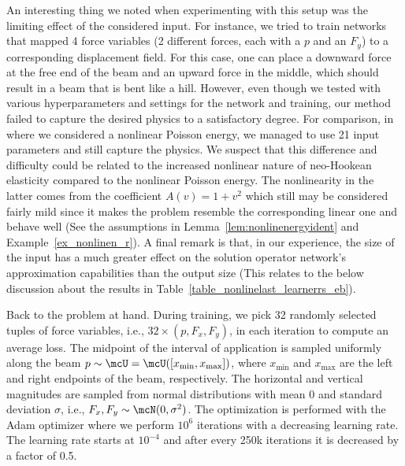 \documentclass[12pt]{article}
\begin{document}
\begin{rem}
An interesting thing we noted when experimenting with this setup was the limiting effect of the considered input. For instance, we tried to train networks that mapped 4 force variables (2 different forces, each with a $p$ and an $F_y$) to a corresponding displacement field. For this case, one can place a downward force at the free end of the beam and an upward force in the middle, which should result in a beam that is bent like a hill. However, even though we tested with various hyperparameters and settings for the network and training, our method failed to capture the desired physics to a satisfactory degree. For comparison, in \cite{BURMAN2025118111} where we considered a nonlinear Poisson energy, we managed to use 21 input parameters and still capture the physics. We suspect that this difference and difficulty could be related to the increased nonlinear nature of neo-Hookean elasticity compared to the nonlinear Poisson energy. The nonlinearity in the latter comes from the coefficient $A(v) = 1 + v^2$ which still may be considered fairly mild since it makes the problem resemble the corresponding linear one and behave well (See the assumptions in Lemma~\ref{lem:nonlinenergyident} and Example~\ref{ex_nonlinen_r}). A final remark is that, in our experience, the size of the input has a much greater effect on the solution operator network's approximation capabilities than the output size (This relates to the below discussion about the results in Table~\ref{table_nonlinelast_learnerrs_eb}).
\end{rem}

Back to the problem at hand. During training, we pick 32 randomly selected tuples of force variables, i.e., $32 \times (p, F_x, F_y)$, in each iteration to compute an average loss. The midpoint of the interval of application is sampled uniformly along the beam $p \sim \mcU = \mcU([x_{\min}, x_{\max}])$, where $x_{\min}$ and $x_{\max}$  are the left and right endpoints of the beam, respectively. The horizontal and vertical magnitudes are sampled from normal distributions with mean 0 and standard deviation $\sigma$, i.e., $F_x, F_y \sim \mcN(0, \sigma^2)$. The optimization is performed with the Adam optimizer where we perform $10^6$ iterations with a decreasing learning rate. The learning rate starts at $10^{-4}$ and after every 250k iterations it is decreased by a factor of 0.5.
\end{document}

